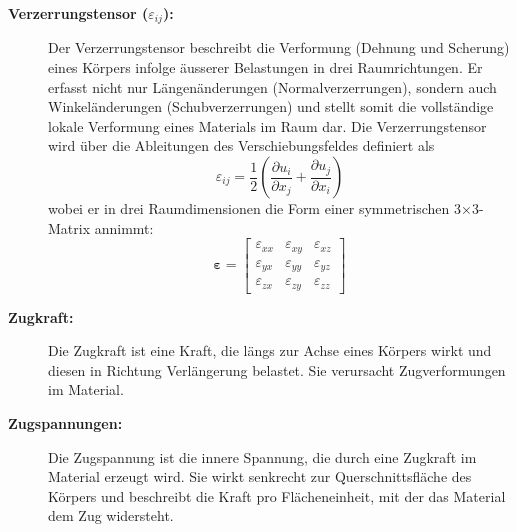\begin{description}
	\item[\textbf{Verzerrungstensor ($\varepsilon_{ij}$):}] Der Verzerrungstensor beschreibt die Verformung (Dehnung und Scherung) eines Körpers infolge äusserer Belastungen in drei Raumrichtungen. 
	Er erfasst nicht nur Längenänderungen (Normalverzerrungen), sondern auch Winkeländerungen (Schubverzerrungen) und stellt somit die vollständige lokale Verformung eines Materials im Raum dar.
	Die Verzerrungstensor wird über die Ableitungen des Verschiebungsfeldes definiert als
	\begin{equation}
		\varepsilon_{ij} = 
		\frac{1}{2} \left( \frac{\partial u_i}{\partial x_j} + \frac{\partial u_j}{\partial x_i} \right)
	\end{equation}
	wobei er in drei Raumdimensionen die Form einer symmetrischen 3×3-Matrix annimmt:
	\begin{equation}
	\boldsymbol{\varepsilon} =
	\begin{bmatrix}
		\varepsilon_{xx} & \varepsilon_{xy} & \varepsilon_{xz} \\
		\varepsilon_{yx} & \varepsilon_{yy} & \varepsilon_{yz} \\
		\varepsilon_{zx} & \varepsilon_{zy} & \varepsilon_{zz}
	\end{bmatrix}
	\end{equation}
	\item[\textbf{Zugkraft:}] Die Zugkraft ist eine Kraft, die längs zur Achse eines Körpers wirkt und diesen in Richtung Verlängerung belastet. 
	Sie verursacht Zugverformungen im Material.
	
	\item[\textbf{Zugspannungen:}] Die Zugspannung ist die innere Spannung, die durch eine Zugkraft im Material erzeugt wird. 
	Sie wirkt senkrecht zur Querschnittsfläche des Körpers und beschreibt die Kraft pro Flächeneinheit, mit der das Material dem Zug widersteht.
\end{description}

